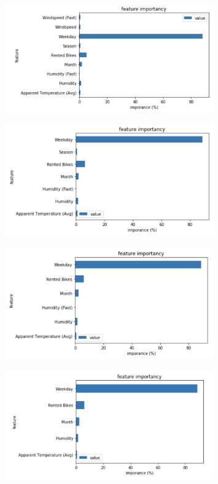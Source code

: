 \begin{figure}[H]
\centering
\includegraphics[width=0.8\textwidth]{media/test3_dt}\label{fig:test3_dt}
\label{fig:test3_dt}
\end{figure}
\begin{figure}[H]
\centering
\includegraphics[width=0.8\textwidth]{media/test4_dt}\label{fig:test4_dt}
\label{fig:test4_dt}
\end{figure}
\begin{figure}[H]
\centering
\includegraphics[width=0.8\textwidth]{media/test5_dt}\label{fig:test5_dt}
\label{fig:test5_dt}
\end{figure}
\begin{figure}[H]
\centering
\includegraphics[width=0.8\textwidth]{media/test6_dt}\label{fig:test6_dt}
\label{fig:test6_dt}
\end{figure}

